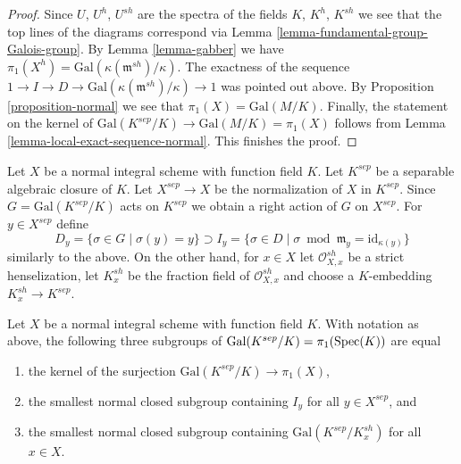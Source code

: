\begin{proof}
\medskip\noindent
Since $U$, $U^h$, $U^{sh}$ are the spectra of the fields
$K$, $K^h$, $K^{sh}$ we see that the top lines of the diagrams
correspond via
Lemma \ref{lemma-fundamental-group-Galois-group}.
By Lemma \ref{lemma-gabber} we have
$\pi_1(X^h) = \text{Gal}(\kappa(\mathfrak m^{sh})/\kappa)$.
The exactness of the sequence
$1 \to I \to D \to \text{Gal}(\kappa(\mathfrak m^{sh})/\kappa) \to 1$
was pointed out above.
By Proposition \ref{proposition-normal}
we see that $\pi_1(X) = \text{Gal}(M/K)$.
Finally, the statement on the kernel of
$\text{Gal}(K^{sep}/K) \to \text{Gal}(M/K) = \pi_1(X)$
follows from Lemma \ref{lemma-local-exact-sequence-normal}.
This finishes the proof.
\end{proof}

\noindent
Let $X$ be a normal integral scheme with function field $K$.
Let $K^{sep}$ be a separable algebraic closure of $K$.
Let $X^{sep} \to X$ be the normalization of $X$ in $K^{sep}$.
Since $G = \text{Gal}(K^{sep}/K)$ acts on $K^{sep}$
we obtain a right action of $G$ on $X^{sep}$.
For $y \in X^{sep}$ define
$$
D_y = \{\sigma \in G \mid \sigma(y) = y\} \supset
I_y = \{\sigma \in D \mid \sigma \bmod \mathfrak m_y =
\text{id}_{\kappa(y)} \}
$$
similarly to the above. On the other hand, for $x \in X$
let $\mathcal{O}_{X, x}^{sh}$ be a strict henselization,
let $K_x^{sh}$ be the fraction field of $\mathcal{O}_{X, x}^{sh}$
and choose a $K$-embedding $K_x^{sh} \to K^{sep}$.

\begin{lemma}
\label{lemma-normal-pione-quotient-inertia}
Let $X$ be a normal integral scheme with function field $K$.
With notation as above, the following three subgroups of
$\text{Gal}(K^{sep}/K) = \pi_1(\mathop{\mathrm{Spec}}(K))$
are equal
\begin{enumerate}
\item the kernel of the surjection
$\text{Gal}(K^{sep}/K) \longrightarrow \pi_1(X)$,
\item the smallest normal closed subgroup containing $I_y$
for all $y \in X^{sep}$, and
\item the smallest normal closed subgroup containing
$\text{Gal}(K^{sep}/K_x^{sh})$ for all $x \in  X$.
\end{enumerate}
\end{lemma}


